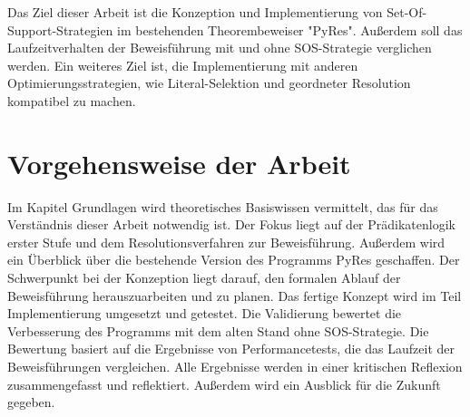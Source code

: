 Das Ziel dieser Arbeit ist die Konzeption und Implementierung von Set-Of-Support-Strategien im bestehenden Theorembeweiser "PyRes". Außerdem soll das Laufzeitverhalten der Beweisführung mit und ohne SOS-Strategie verglichen werden. Ein weiteres Ziel ist, die Implementierung mit anderen Optimierungsstrategien, wie Literal-Selektion und geordneter Resolution kompatibel zu machen.

\section{Vorgehensweise der Arbeit}

Im Kapitel Grundlagen wird theoretisches Basiswissen vermittelt, das für das Verständnis dieser Arbeit notwendig ist. Der Fokus liegt auf der Prädikatenlogik erster Stufe und dem Resolutionsverfahren zur Beweisführung. Außerdem wird ein Überblick über die bestehende Version des Programms PyRes geschaffen.
Der Schwerpunkt bei der Konzeption liegt darauf, den formalen Ablauf der Beweisführung herauszuarbeiten und zu planen. Das fertige Konzept wird im Teil Implementierung umgesetzt und getestet.
Die Validierung bewertet die Verbesserung des Programms mit dem alten Stand ohne SOS-Strategie. Die Bewertung basiert auf die Ergebnisse von Performancetests, die das Laufzeit der Beweisführungen vergleichen.
Alle Ergebnisse werden in einer kritischen Reflexion zusammengefasst und reflektiert. Außerdem wird ein Ausblick für die Zukunft gegeben.